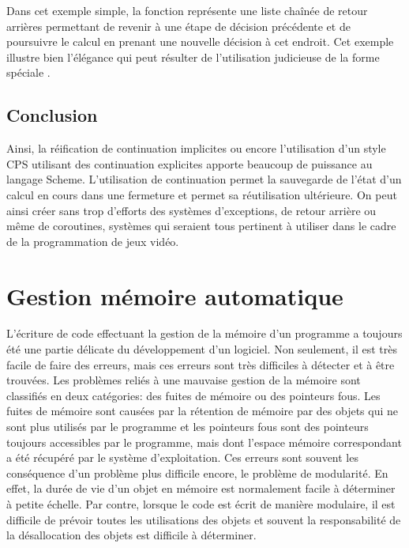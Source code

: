 \documentclass[12pt,oneside,letterpaper,francais]{book}
\newcommand{\scheme}[1]{\selectlanguage{english}{\tt #1}\selectlanguage{french}}
\begin{document}
Dans cet exemple simple, la fonction \scheme{fail} représente une
liste chaînée de retour arrières permettant de revenir à une étape de
décision précédente et de poursuivre le calcul en prenant une nouvelle
décision à cet endroit. Cet exemple illustre bien l'élégance qui peut
résulter de l'utilisation judicieuse de la forme spéciale
\scheme{call/cc}.

\subsection{Conclusion}

Ainsi, la réification de continuation implicites ou encore
l'utilisation d'un style CPS utilisant des continuation explicites
apporte beaucoup de puissance au langage Scheme. L'utilisation de
continuation permet la sauvegarde de l'état d'un calcul en cours dans
une fermeture et permet sa réutilisation ultérieure. On peut ainsi
créer sans trop d'efforts des systèmes d'exceptions, de retour arrière
ou même de coroutines, systèmes qui seraient tous pertinent à utiliser
dans le cadre de la programmation de jeux vidéo.





\section{Gestion mémoire automatique}

L'écriture de code effectuant la gestion de la mémoire d'un programme
a toujours été une partie délicate du développement d'un logiciel. Non
seulement, il est très facile de faire des erreurs, mais ces erreurs
sont très difficiles à détecter et à être trouvées. Les problèmes
reliés à une mauvaise gestion de la mémoire sont classifiés en deux
catégories: des fuites de mémoire ou des pointeurs fous. Les fuites de
mémoire sont causées par la rétention de mémoire par des objets qui ne
sont plus utilisés par le programme et les pointeurs fous sont des
pointeurs toujours accessibles par le programme, mais dont l'espace
mémoire correspondant a été récupéré par le système
d'exploitation. Ces erreurs sont souvent les conséquence d'un problème
plus difficile encore, le problème de modularité. En effet, la durée
de vie d'un objet en mémoire est normalement facile à déterminer à
petite échelle. Par contre, lorsque le code est écrit de manière
modulaire, il est difficile de prévoir toutes les utilisations des
objets et souvent la responsabilité de la désallocation des objets est
difficile à déterminer.
\end{document}
